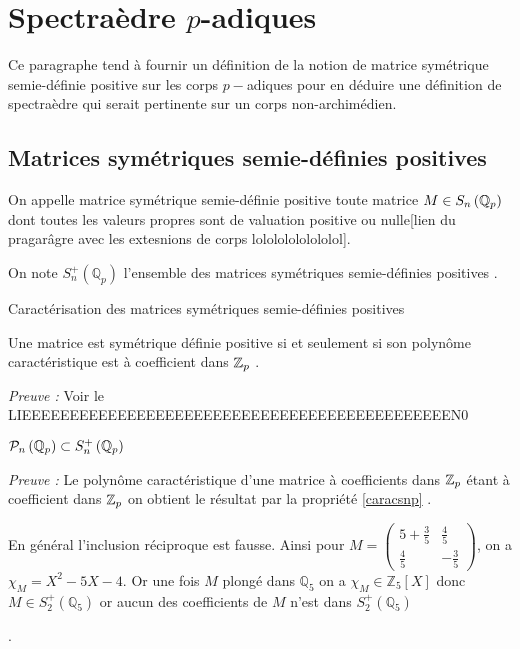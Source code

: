 \newcommand\mat{matrice symétrique semie-définie positive } 
\newcommand\Mat{Matrice symétrique semie-définie positive }
\newcommand\mats{matrices symétriques semie-définies positives }
\newcommand\Mats{Matrices symétriques semie-définies positives }


\section{Spectraèdre \texorpdfstring{$p$}{p}-adiques } 
Ce paragraphe tend à fournir un définition de la notion de \mat sur les corps $p-$adiques pour en déduire une définition de spectraèdre qui serait pertinente sur un corps non-archimédien. 
\subsection{\Mats} 

\begin{definition}
	On appelle \mat toute matrice $M \in S_n\left( \mathbb{Q}_p \right) $ dont toutes les valeurs propres sont de valuation positive ou nulle[lien du pragarâgre avec les extesnions de corps lolololololololol].

	On note $S_n^+\left( \mathbb{Q}_p \right)$ l'ensemble des \mats.
\end{definition}
\begin{propriete}
	\label{caracsnp}
	Caractérisation des \mats

	Une matrice est symétrique définie positive si et seulement si son polynôme caractéristique est à coefficient dans $ \mathbb {Z}_p $ .
	
\end{propriete}
	\textit{Preuve :} Voir le LIEEEEEEEEEEEEEEEEEEEEEEEEEEEEEEEEEEEEEEEEEEEEEN0

\begin{consequence}
	$\mathcal{P}_n \left( \mathbb{Q}_p \right) \subset S_n^+\left( \mathbb{Q}_p \right)$ 
\end{consequence}

\textit{Preuve : }  Le polynôme caractéristique d'une matrice à coefficients dans $ \mathbb {Z}_p $ étant à coefficient dans $ \mathbb {Z}_p $ on obtient le résultat par la propriété \ref{caracsnp} .

\begin{remarque}
	En général l'inclusion réciproque est fausse. Ainsi pour $M = \begin{pmatrix} 5 + \frac{3}{5} & \frac{4}{5} \\ \frac{4}{5} & -\frac{3}{5} \end{pmatrix} $, on a $\chi_M = X^2  - 5 X - 4$. Or une fois $M$ plongé dans $\mathbb{Q}_5$ on a $\chi_M \in \mathbb{Z}_5[X]$ donc $M \in S_2^+\left( \mathbb{Q}_5 \right)$ or aucun des coefficients de $M$ n'est dans $S_2^+\left( \mathbb{Q}_5 \right)$

\end{remarque}

.
